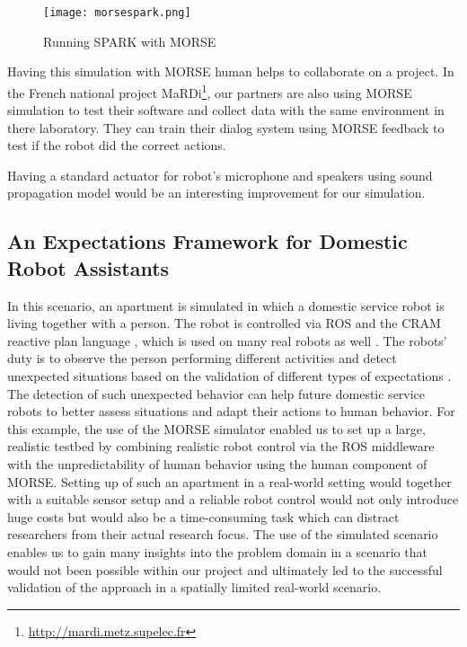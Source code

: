 \documentclass[conference]{IEEEtran}
\begin{document}
\begin{figure}[H]
      \centering
      \texttt{[image: morsespark.png]}
      \caption{Running SPARK with MORSE}
      \label{fig|spark}
\end{figure}

Having this simulation with MORSE human helps to collaborate on a project.
In the French national project MaRDi\footnote{\url{http://mardi.metz.supelec.fr}},
our partners are also using MORSE simulation to test their software and collect 
data with the same environment in there laboratory.
They can train their dialog system using MORSE feedback to test if the robot
did the correct actions.

Having a standard actuator for robot's microphone and speakers using sound
propagation model would be an interesting improvement for our simulation.

\subsection{An Expectations Framework for Domestic Robot Assistants}
\label{sc:expectations}

In this scenario, an apartment is simulated in which a domestic service robot is
living together with a person. The robot is controlled via ROS and the CRAM
reactive plan language \cite{beetz2010cram}, which is used on many real robots
as well \cite{pancakes11humanoids}. The robots' duty is to observe the person
performing different activities and detect unexpected situations based on the
validation of different types of expectations \cite{Karg2013}. The detection of
such unexpected behavior can help future domestic service robots to better
assess situations and adapt their actions to human behavior. For this example,
the use of the MORSE simulator enabled us to set up a large, realistic testbed
by combining realistic robot control via the ROS middleware with the
unpredictability of human behavior using the human component of MORSE. Setting
up of such an apartment in a real-world setting would together with a suitable
sensor setup and a reliable robot control would not only introduce huge costs
but would also be a time-consuming task which can distract researchers from
their actual research focus. The use of the simulated scenario enables us to
gain many insights into the problem domain in a scenario that would not been
possible within our project and ultimately led to the successful validation of
the approach in a spatially limited real-world scenario.
\end{document}
